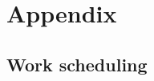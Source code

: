 
\section{Appendix} %
\label{sec:attachments}

\subsection{Work scheduling}
\label{sub:work_scheduling}


